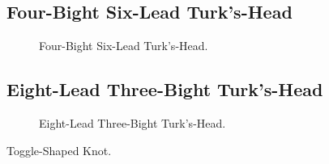 \subsection{Four-Bight Six-Lead Turk’s-Head}

\begin{figure}[H]\centering
	\begin{minipage}{1\linewidth}
		\begin{center}
			\tcbox[enhanced jigsaw,colframe=black,opacityframe=0.5,opacityback=0.5]
			{\centering{}}
		\end{center}
	\end{minipage}
\caption{Four-Bight Six-Lead Turk’s-Head.}
\label{ris:Turk-Head_7}
\end{figure}

\subsection{Eight-Lead Three-Bight Turk’s-Head}

\begin{figure}[H]\centering
	\begin{minipage}{1\linewidth}
		\begin{center}
			\tcbox[enhanced jigsaw,colframe=black,opacityframe=0.5,opacityback=0.5]
			{\centering{}}
		\end{center}
	\end{minipage}
\caption{Eight-Lead Three-Bight Turk’s-Head.}
\label{ris:Turk-Head_8}
\end{figure}

Toggle-Shaped Knot.

